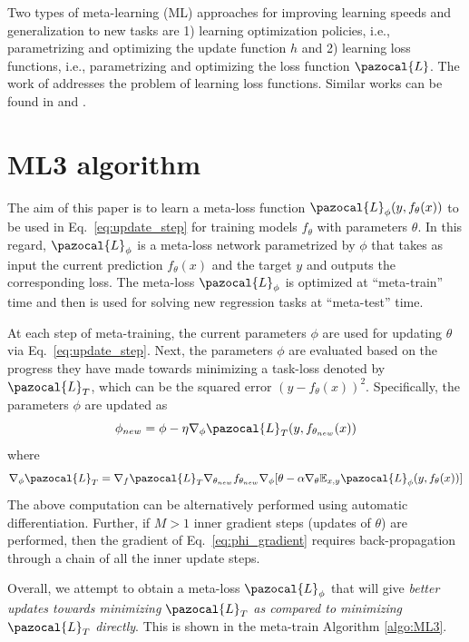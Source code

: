 Two types of meta-learning (ML) approaches for improving learning speeds and generalization to new tasks are 1) learning optimization policies, i.e., parametrizing and optimizing the update function $h$ and 2) learning loss functions, i.e., parametrizing and optimizing the loss function $\pazocal{L}$.
The work of \textcite{bechtle2020metalearning} addresses the problem of learning loss functions.
Similar works can be found in \textcite{houthooft2018evolved} and \textcite{sung2017learning}.

\section{ML3 algorithm}

The aim of this paper is to learn a meta-loss function $\pazocal{L}_{\phi}(y, f_{\theta}(x))$ to be used in Eq.~\eqref{eq:update_step} for training models $f_{\theta}$ with parameters $\theta$.
In this regard, $\pazocal{L}_{\phi}$ is a meta-loss network parametrized by $\phi$ that takes as input the current prediction $f_{\theta}(x)$ and the target $y$ and outputs the corresponding loss.
The meta-loss $\pazocal{L}_{\phi}$ is optimized at ``meta-train'' time and then is used for solving new regression tasks at ``meta-test'' time.

At each step of meta-training, the current parameters $\phi$ are used for updating $\theta$ via Eq.~\eqref{eq:update_step}. 
Next, the parameters $\phi$ are evaluated based on the progress they have made towards minimizing a task-loss denoted by $\pazocal{L}_T$, which can be the squared error $(y-f_{\theta}(x))^2$.
Specifically, the parameters $\phi$ are updated as
\begin{equation}\label{eq:phi_update_step}
	\phi_{new} = \phi - \eta \nabla_{\phi}\pazocal{L}_T(y, f_{\theta_{new}}(x))
\end{equation} 
where 
\begin{equation}\label{eq:phi_gradient}
	\nabla_{\phi}\pazocal{L}_T = \nabla_f\pazocal{L}_T\nabla_{\theta_{new}}f_{\theta_{new}}
	\nabla_{\phi}[\theta - \alpha\nabla_{\theta}\mathbb{E}_{x,y}\pazocal{L}_{\phi}(y, f_{\theta}(x))]
\end{equation} 
The above computation can be alternatively performed using automatic differentiation.
Further, if $M>1$ inner gradient steps (updates of $\theta$) are performed, then the gradient of Eq.~\eqref{eq:phi_gradient} requires back-propagation through a chain of all the inner update steps.

Overall, we attempt to obtain a meta-loss $\pazocal{L}_{\phi}$ that will give \textit{better updates towards minimizing} $\pazocal{L}_{T}$ \textit{as compared to minimizing} $\pazocal{L}_{T}$ \textit{directly}.
This is shown in the meta-train Algorithm \ref{algo:ML3}.


